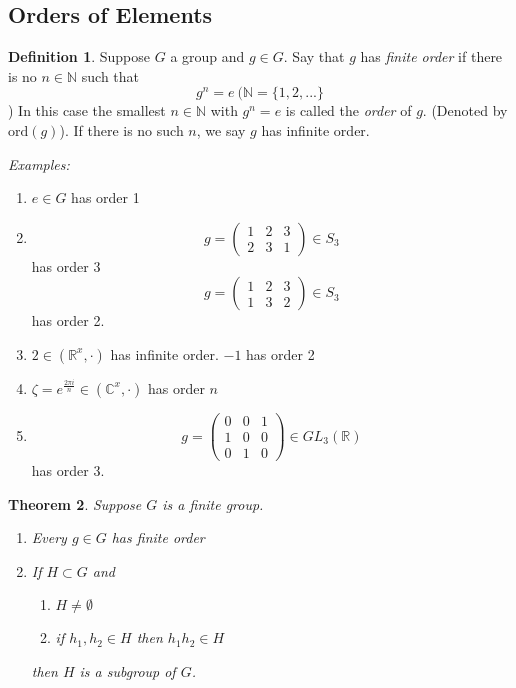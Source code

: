 \documentclass{report}
\newtheorem{theorem}{Theorem}[subsection]
\theoremstyle{remark}
\theoremstyle{definition}
\newtheorem{definition}[theorem]{Definition}
\theoremstyle{definition}
\theoremstyle{theorem}
\begin{document}
\subsection{Orders of Elements}
\begin{definition}
Suppose $G$ a group and $g \in G$. Say that $g$ has \emph{finite order} if there is no $n \in \mathbb{N}$ such that
\[g^n=e \> (\mathbb{N} = \{1,2,...\}\])
In this case the smallest $n \in \mathbb{N}$ with $g^n=e$ is called the \emph{order} of $g$. (Denoted by $\mathrm{ord}(g)$). If there is no such $n$, we say $g$ has infinite order.
\end{definition}
\emph{Examples:}
\begin{enumerate}[label=\textcircled{\tiny{\arabic*}}]
    \item $e \in G$ has order 1
    \item \[g = \begin{pmatrix}
    1&2&3\\
    2&3&1
    \end{pmatrix} \in S_3\]
    has order 3
    \[g = \begin{pmatrix}
    1&2&3\\
    1&3&2
    \end{pmatrix} \in S_3\]
    has order 2.
    \item $2 \in (\mathbb{R}^x, \cdot)$ has infinite order. $-1$ has order 2
    \item $\zeta = e^{\frac{2\pi i}{n}} \in (\mathbb{C}^x, \cdot)$ has order $n$
    \item
    \[g=\begin{pmatrix}
    0&0&1\\
    1&0&0\\
    0&1&0
    \end{pmatrix} \in GL_3(\mathbb{R})\]
    has order 3.
\end{enumerate}
\begin{theorem}
Suppose $G$ is a finite group.
\begin{enumerate}[label=\arabic*)]
    \item Every $g \in G$ has finite order
    \item If $H \subset G$ and
    \begin{enumerate}[label=\roman*)]
        \item $H \neq \emptyset$
        \item if $h_1, h_2 \in H$ then $h_1h_2 \in H$
    \end{enumerate}
    then $H$ is a subgroup of $G$.
\end{enumerate}
\end{theorem}
\end{document}
